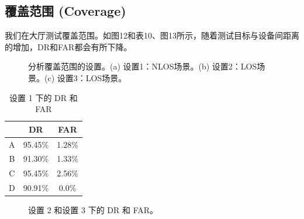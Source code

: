 \documentclass[journal]{IEEEtran}
\begin{document}
\begin{table}[htbp]
\centering
\caption{带环境运动的检测结果 (DETECTION RESULTS WITH AMBIENT MOTION)}
\end{table}

\subsection{覆盖范围 (Coverage)}
我们在大厅测试覆盖范围。如图12和表10、图13所示，随着测试目标与设备间距离的增加，DR和FAR都会有所下降。

\begin{figure}[htbp]
\centering
\vspace{4cm} %
\caption{分析覆盖范围的设置。(a) 设置1：NLOS场景。(b) 设置2：LOS场景。(c) 设置3：LOS场景。}
\end{figure}

\begin{table}[htbp]
\centering
\caption{设置 1 下的 DR 和 FAR}
\begin{tabular}{c c c}
\toprule
 & \textbf{DR} & \textbf{FAR} \\
\midrule
A & 95.45\% & 1.28\% \\
B & 91.30\% & 1.33\% \\
C & 95.45\% & 2.56\% \\
D & 90.91\% & 0.0\% \\
\bottomrule
\end{tabular}
\end{table}

\begin{figure}[htbp]
\centering
\vspace{4cm} %
\caption{设置 2 和设置 3 下的 DR 和 FAR。}
\end{figure}
\end{document}
